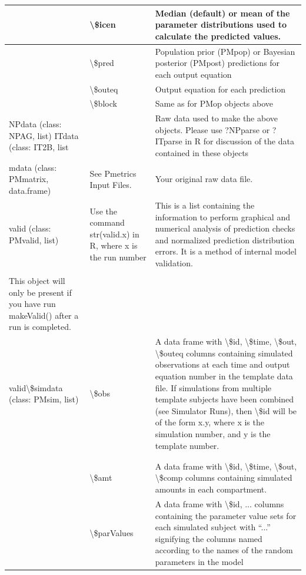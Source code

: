 \documentclass[
]{book}
\begin{document}
\begin{tabular}{l|l|l}
\hline
 & \textbackslash{}\$icen & Median (default) or mean of the parameter distributions used to calculate the predicted values.\\
\hline
 & \textbackslash{}\$pred & Population prior (PMpop) or Bayesian posterior (PMpost) predictions for each output equation\\
\hline
 & \textbackslash{}\$outeq & Output equation for each prediction\\
\hline
 & \textbackslash{}\$block & Same as for PMop objects above\\
\hline
NPdata (class: NPAG, list) ITdata (class: IT2B, list &  & Raw data used to make the above objects.  Please use ?NPparse or ?ITparse in R for discussion of the data contained in these objects\\
\hline
mdata (class: PMmatrix, data.frame) & See Pmetrics Input Files. & Your original raw data file.\\
\hline
valid (class: PMvalid, list) & Use the command str(valid.x) in R, where x is the run number & This is a list containing the information to perform graphical and numerical analysis of prediction checks and normalized prediction distribution errors.  It is a method of internal model validation.\\
\hline
 &  & \\
\hline
This object will only be present if you have run makeValid() after a run is completed. &  & \\
\hline
valid\textbackslash{}\$simdata (class: PMsim, list) & \textbackslash{}\$obs & A data frame with \textbackslash{}\$id, \textbackslash{}\$time, \textbackslash{}\$out, \textbackslash{}\$outeq columns containing simulated observations at each time and output equation number in the template data file.  If simulations from multiple template subjects have been combined (see Simulator Runs), then \textbackslash{}\$id will be of the form x.y, where x is the simulation number, and y is the template number.\\
\hline
 &  & \\
\hline
 &  & \\
\hline
 & \textbackslash{}\$amt & A data frame with \textbackslash{}\$id, \textbackslash{}\$time, \textbackslash{}\$out, \textbackslash{}\$comp columns containing simulated amounts in each compartment.\\
\hline
 & \textbackslash{}\$parValues & A data frame with \textbackslash{}\$id, ... columns containing the parameter value sets for each simulated subject with “...” signifying the columns named  according to the names of the random parameters in the model\\

\end{tabular}
\end{document}
